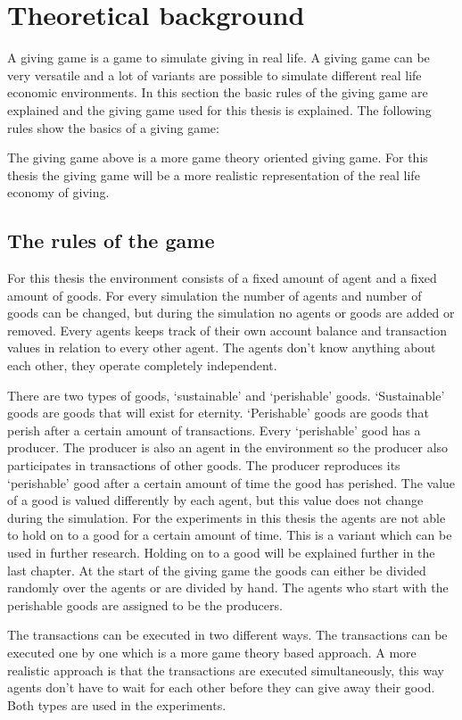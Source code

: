 \documentclass[twoside,openright]{uva-bachelor-thesis}
\begin{document}
\chapter{Theoretical background}
A giving game is a game to simulate giving in real life. A giving game can be very versatile and a lot of variants are possible to simulate different real life economic environments. In this section the basic rules of the giving game are explained and the giving game used for this thesis is explained.
The following rules show the basics of a giving game:

The giving game above is a more game theory oriented giving game. For this thesis the giving game will be a more realistic representation of the real life economy of giving.


\section{The rules of the game}
For this thesis the environment consists of a fixed amount of agent and a fixed amount of goods. For every simulation the number of agents and number of goods can be changed, but during the simulation no agents or goods are added or removed.  Every agents keeps track of their own account balance and transaction values in relation to every other agent. The agents don’t know anything about each other, they operate completely independent.

There are two types of goods, ‘sustainable’ and ‘perishable’ goods. ‘Sustainable’ goods are goods that will exist for eternity. ‘Perishable’ goods are goods that perish after a certain amount of transactions. Every ‘perishable’ good has a producer. The producer is also an agent in the environment so the producer also participates in transactions of other goods. The producer reproduces its ‘perishable’ good after a certain amount of time the good has perished. The value of a good is valued differently by each agent, but this value does not change during the simulation. For the experiments in this thesis the agents are not able to hold on to a good for a certain amount of time. This is a variant which can be used in further research. Holding on to a good will be explained further in the last chapter. At the start of the giving game the goods can either be divided randomly over the agents or are divided by hand. The agents who start with the perishable goods are assigned to be the producers.

The transactions can be executed in two different ways. The transactions can be executed one by one which is a more game theory based approach. A more realistic approach is that the transactions are executed simultaneously, this way agents don’t have to wait for each other before they can give away their good. Both types are used in the experiments.
\end{document}
